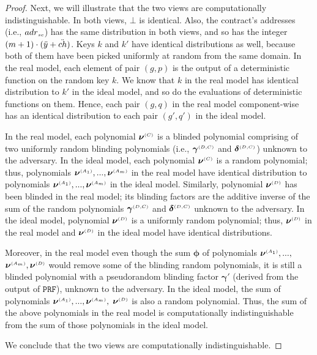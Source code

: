 \begin{proof}
 Next, we will illustrate that the two views are computationally indistinguishable. In both views, $\bot$ is identical. Also, the contract’s addresses (i.e., ${adr}_{\scriptscriptstyle sc}$) has the same
distribution in both views, and so has the integer $(m+1)\cdot(\ddot{y}+\ddot{ch})$. Keys $k$ and $  k'$ have identical distributions as well, because both of them have been picked uniformly at random from the same domain.  In the real model, each element of pair $(g, p)$ is the output of a deterministic function on the random key $k$. We know that $k$ in the real model has identical distribution to $  k'$ in the ideal model, and so do the evaluations of deterministic functions on them. Hence, each pair $(g, q)$ in the real model component-wise has an identical distribution to each pair $(g', q')$ in the ideal model. 

In the real model, each polynomial  $\bm\nu^{\scriptscriptstyle (C)}$ is a blinded polynomial comprising of two uniformly random blinding polynomials (i.e., $\bm\gamma^{ \scriptscriptstyle {  {(D,C)}}}$ and $\bm\delta^{ \scriptscriptstyle {  {(D,C)}}}$) unknown to the adversary. In the ideal model, each polynomial  $ {\bm\nu}^{\scriptscriptstyle (C)}$ is a random polynomial; thus, polynomials $\bm\nu^{\scriptscriptstyle (A_1)},..., \bm\nu^{\scriptscriptstyle (A_m)}$ in the real model have identical distribution to  polynomials $ {\bm\nu}^{\scriptscriptstyle (A_1)}, ...,  {\bm\nu}^{\scriptscriptstyle (A_m)}$ in the ideal model.  Similarly,  polynomial $\bm\nu^{\scriptscriptstyle (D)}$ has been blinded in the real model; its blinding factors are the additive inverse of  the sum of the random polynomials $\bm\gamma^{ \scriptscriptstyle {  {(D,C)}}}$ and $\bm\delta^{ \scriptscriptstyle {  {(D,C)}}}$ unknown to the adversary. In the ideal model, polynomial $ {\bm\nu}^{\scriptscriptstyle (D)}$ is a uniformly random polynomial; thus, ${\bm\nu}^{\scriptscriptstyle (D)}$ in the real model and $ {\bm\nu}^{\scriptscriptstyle (D)}$ in the ideal model have identical distributions.

Moreover, in the real model even though the sum $\bm\phi$ of polynomials  $\bm\nu^{\scriptscriptstyle (A_1)},..., $ $\bm\nu^{\scriptscriptstyle (A_m)}, \bm\nu^{\scriptscriptstyle (D)}$ would remove some of the blinding random polynomials, it is still a blinded polynomial with a pseudorandom blinding factor $\bm\gamma'$ (derived from the output of $\mathtt{PRF}$), unknown to the adversary. In the ideal model, the sum of polynomials $ {\bm\nu}^{\scriptscriptstyle (A_1)}, ...,  {\bm\nu}^{\scriptscriptstyle (A_m)}, $ $ {\bm\nu}^{\scriptscriptstyle (D)}$ is also a random polynomial. Thus, the sum of the above polynomials in the real model is computationally indistinguishable from the sum of those polynomials in the ideal model. 

We conclude that the two views are computationally indistinguishable. 
\end{proof}
















